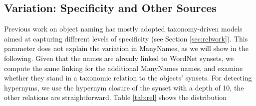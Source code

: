 \subsection{Variation: Specificity and Other Sources}
\label{ssec:variation}
Previous work on object naming has mostly adopted taxonomy-driven models aimed at capturing different levels of specificity (see Section \ref{sec:relwork}).
This parameter does not explain the variation in ManyNames, as we will show in the following. 
Given that the \vg names are already linked to WordNet synsets, we compute the same linking for the additional ManyNames names, and examine whether they stand in a taxonomic relation to the objects'  \vg  synsets.
For detecting hypernyms, we use the hypernym closure of the synset with a depth of 10, the other relations are straightforward. 
%
Table \ref{tab:rel} shows the distribution
